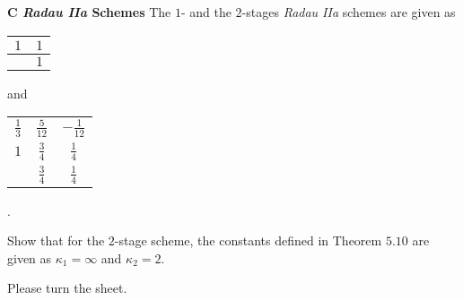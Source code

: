 \documentclass[a4paper,10pt]{article}
\begin{document}
{\bf C \emph{Radau IIa} Schemes}
The $1$- and the $2$-stages \emph{Radau IIa} schemes are given as 
\smallskip

\begin{minipage}[t]{.3\textwidth}
	\centering
		\begin{tabular}{c|c}
			$1 $ &$1$ \\
			\hline
			&$ 1$\\
		\end{tabular}
\end{minipage} and
\begin{minipage}[t]{.3\textwidth}
	\centering
	\begin{tabular}{c|cc}
		$\frac 13 $ &$ \frac 5{12}$ &$-\frac 1{12}$ \\
		$1$ &$ \frac 34 $ &$ \frac 14$\\
		\hline
		&$ \frac 34 $ &$ \frac 14$\\
	\end{tabular}
\end{minipage}.

Show that for the $2$-stage scheme, the constants defined in Theorem $5.10$ are given as $\kappa_1=\infty$ and $\kappa_2 = 2$.

\vfill

\begin{flushright}
	Please turn the sheet.
\end{flushright}
\end{document}
